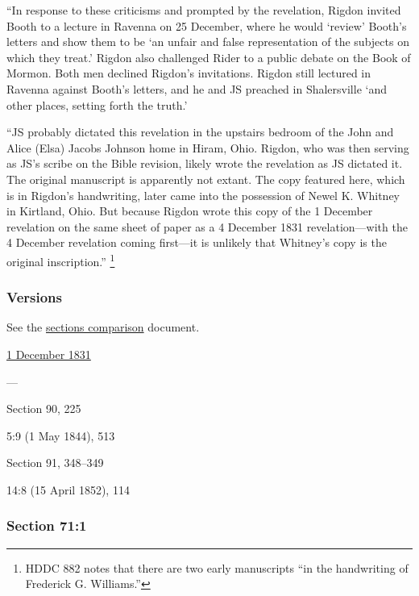			``In response to these criticisms and prompted by the revelation, Rigdon invited Booth to a lecture in Ravenna on 25 December, where he would `review' Booth's letters and show them to be `an unfair and false representation of the subjects on which they treat.' Rigdon also challenged Rider to a public debate on the Book of Mormon. Both men declined Rigdon's invitations. Rigdon still lectured in Ravenna against Booth's letters, and he and JS preached in Shalersville `and other places, setting forth the truth.'
			
			``JS probably dictated this revelation in the upstairs bedroom of the John and Alice (Elsa) Jacobs Johnson home in Hiram, Ohio. Rigdon, who was then serving as JS's scribe on the Bible revision, likely wrote the revelation as JS dictated it. The original manuscript is apparently not extant. The copy featured here, which is in Rigdon's handwriting, later came into the possession of Newel K. Whitney in Kirtland, Ohio. But because Rigdon wrote this copy of the 1 December revelation on the same sheet of paper as a 4 December 1831 revelation---with the 4 December revelation coming first---it is unlikely that Whitney's copy is the original inscription.''%
				\footnote{%
					HDDC 882 notes that there are two early manuscripts ``in the handwriting of Frederick G. Williams.''
					}
			
	\subsubsection{Versions}
		\label{DC71-V}
		
		See the \href{https://drive.google.com/file/d/1goAvNz8jS4R8slYfMG_db55Ty2z_vmgK/view?usp=sharing}{sections comparison} document.
	
		\begin{compactdesc}
			\item[JSP] \hyperref[EMS-1831-JS-1-DEC-1831]{1 December 1831}
			\item[BC] ---
			\item[DC 1835] Section 90, 225
			\item[TS] 5:9 (1 May 1844), 513
			\item[DC 1844] Section 91, 348--349
			\item[MS] 14:8 (15 April 1852), 114
		\end{compactdesc}

	\subsubsection{Section 71:1} %
		\label{DC71-1}

